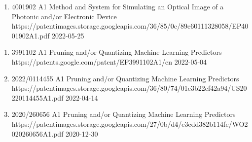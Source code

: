 {
    \ifdefined\shortcv
        {}
    \else
        {
            \begin{enumerate}
                \item [] 
                                        {4001902 A1}
                                        {Method and System for Simulating an Optical Image of a Photonic and/or Electronic Device}
                                        {https://patentimages.storage.googleapis.com/36/85/0c/89e60111328058/EP4001902A1.pdf}
                                        {2022-05-25}
            \end{enumerate}
        }
    \fi
}


{
    \ifdefined\shortcv
        {}
    \else
        {
            \begin{enumerate}
                \item [] 
                                        {3991102 A1}
                                        {Pruning and/or Quantizing Machine Learning Predictors}
                                        {https://patents.google.com/patent/EP3991102A1/en}
                                        {2022-05-04}
                \item [] 
                                        {2022/0114455 A1}
                                        {Pruning and/or Quantizing Machine Learning Predictors}
                                        {https://patentimages.storage.googleapis.com/36/80/74/01e3b22ef42a94/US20220114455A1.pdf}
                                        {2022-04-14}
                \item [] 
                                        {2020/260656 A1}
                                        {Pruning and/or Quantizing Machine Learning Predictors}
                                        {https://patentimages.storage.googleapis.com/27/0b/d4/e3edd382b114fe/WO2020260656A1.pdf}
                                        {2020-12-30}
            \end{enumerate}
        }
    \fi
}

